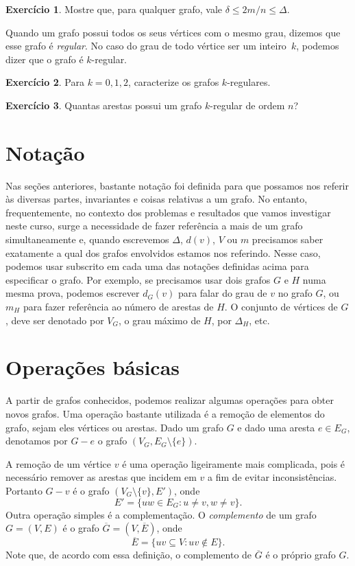 \documentclass[12pt, a4paper]{article}
\theoremstyle{definition}
\newtheorem{exer}{Exercício}
\begin{document}
\begin{exer}
Mostre que, para qualquer grafo, vale $\delta \leq 2m/n \leq \Delta$.
\end{exer}

\noindent Quando um grafo possui todos os seus vértices com o mesmo grau, dizemos que esse grafo é \emph{regular}. No caso do grau de todo vértice ser um inteiro~$k$, podemos dizer que o grafo é $k$-regular.

\begin{exer}
Para $k = 0,1,2$, caracterize os grafos $k$-regulares.
\end{exer}

\begin{exer}
Quantas arestas possui um grafo $k$-regular de ordem $n$?
\end{exer}

\section {Notação }

Nas seções anteriores, bastante notação foi definida para que possamos nos referir às diversas partes, invariantes e coisas relativas a um grafo. No entanto, frequentemente, no contexto dos problemas e resultados que vamos investigar neste curso, surge a necessidade de fazer referência a mais de um grafo simultaneamente e, quando escrevemos $\Delta$, $d(v)$, $V$ ou $m$ precisamos saber exatamente a qual dos grafos envolvidos estamos nos referindo. Nesse caso, podemos usar subscrito em cada uma das notações definidas acima para especificar o grafo. Por exemplo, se precisamos usar dois grafos $G$ e $H$ numa mesma prova, podemos escrever $d_G(v)$ para falar do grau de $v$ no grafo $G$, ou $m_H$ para fazer referência ao número de arestas de $H$. O conjunto de vértices de $G$, deve ser denotado por $V_G$, o grau máximo de $H$, por $\Delta_H$, etc.


\section{Operações básicas}

A partir de grafos conhecidos, podemos realizar algumas operações para obter novos grafos. Uma operação bastante utilizada é a remoção de elementos do grafo, sejam eles vértices ou arestas. Dado um grafo $G$ e dado uma aresta $e \in E_G$, denotamos por $G - e$ o grafo $(V_G, E_G \setminus \{e\})$.

A remoção de um vértice $v$ é uma operação ligeiramente mais complicada, pois é necessário remover as arestas que incidem em $v$ a fim de evitar inconsistências. Portanto $G - v$ é o grafo $(V_G \setminus \{v\}, E')$, onde
\[ E' = \{ uw \in E_G \colon u \neq v, w \neq v \}. \]
Outra operação simples é a complementação. O \emph{complemento} de um grafo $G = (V,E)$ é o grafo $\overline{G} = (V, \overline{E})$, onde 
\[ \overline{E} = \big\{ uv \subseteq V \colon uv \not\in E\big\}. \]
Note que, de acordo com essa definição, o complemento de $\overline{G}$ é o próprio grafo $G$.
\end{document}

